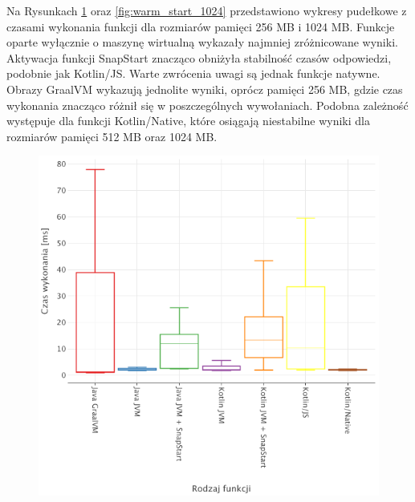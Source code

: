 Na Rysunkach \ref{fig:warm_start_256} oraz \ref{fig:warm_start_1024} przedstawiono wykresy pudełkowe z czasami wykonania funkcji dla rozmiarów pamięci 256 MB i 1024 MB.
Funkcje oparte wyłącznie o maszynę wirtualną wykazały najmniej zróżnicowane wyniki.
Aktywacja funkcji SnapStart znacząco obniżyła stabilność czasów odpowiedzi, podobnie jak Kotlin/JS.
Warte zwrócenia uwagi są jednak funkcje natywne. 
Obrazy GraalVM wykazują jednolite wyniki, oprócz pamięci 256 MB, gdzie czas wykonania znacząco różnił się w poszczególnych wywołaniach.
Podobna zależność występuje dla funkcji Kotlin/Native, które osiągają niestabilne wyniki dla rozmiarów pamięci 512 MB oraz 1024 MB.

\begin{figure}[h]
    \centering %
    \begin{minipage}[t]{0.48\textwidth} %
        \centering %
        \includegraphics[width=\linewidth]{charts/results/warm-start-boxplot-256.png}
        \label{fig:warm_start_256} %
    \end{minipage}%
    \hfill %

\end{figure}
